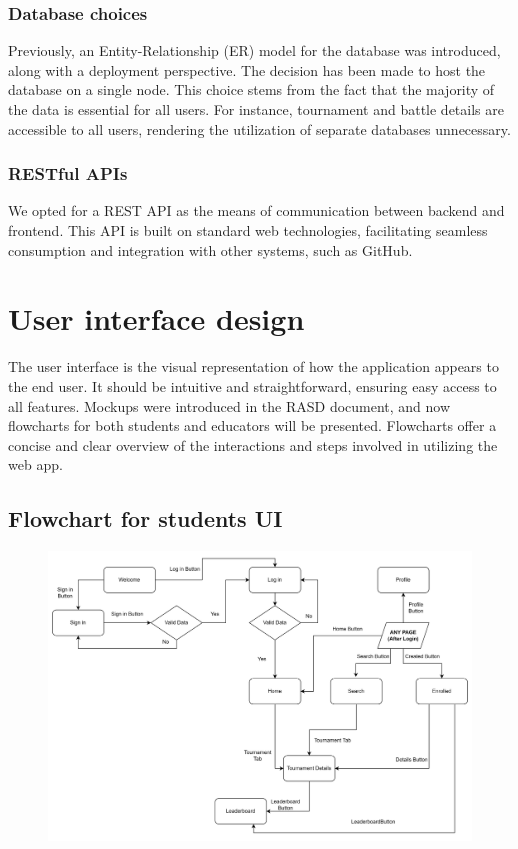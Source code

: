 \documentclass[12pt, a4paper]{report}
\begin{document}
        \subsection{Database choices}
        Previously, an Entity-Relationship (ER) model for the database was introduced, along with a deployment perspective.
        The decision has been made to host the database on a single node.
        This choice stems from the fact that the majority of the data is essential for all users.
        For instance, tournament and battle details are accessible to all users, rendering the utilization of separate databases unnecessary.
        
        \subsection{RESTful APIs}
        We opted for a REST API as the means of communication between backend and frontend.
        This API is built on standard web technologies, facilitating seamless consumption and integration with other systems, such as GitHub.

\chapter{User interface design}
    The user interface is the visual representation of how the application appears to the end user.
    It should be intuitive and straightforward, ensuring easy access to all features.
    Mockups were introduced in the RASD document, and now flowcharts for both students and educators will be presented.
    Flowcharts offer a concise and clear overview of the interactions and steps involved in utilizing the web app.

    \section{Flowchart for students UI}
    \begin{figure}[H]
        \centering
        \includegraphics[width=0.9\linewidth]{images/students_UI.png}
    \end{figure}
\end{document}
